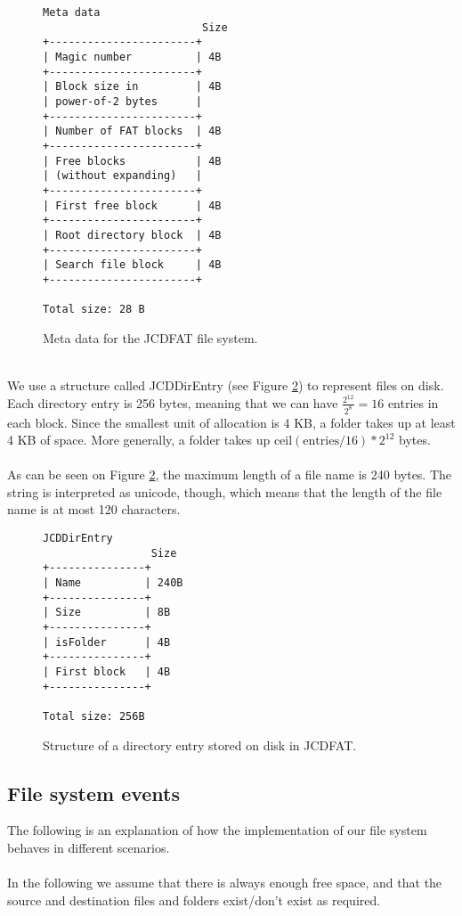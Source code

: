 \documentclass[11pt]{article}
\begin{document}
\begin{figure}[ht]
    \begin{verbatim}
Meta data
                         Size
+-----------------------+
| Magic number          | 4B
+-----------------------+
| Block size in         | 4B
| power-of-2 bytes      |
+-----------------------+
| Number of FAT blocks  | 4B
+-----------------------+
| Free blocks           | 4B
| (without expanding)   |
+-----------------------+
| First free block      | 4B
+-----------------------+
| Root directory block  | 4B
+-----------------------+
| Search file block     | 4B
+-----------------------+

Total size: 28 B
    \end{verbatim}
    \caption{Meta data for the JCDFAT file system.}
    \label{fig:meta_data}
\end{figure}
~\\
We use a structure called JCDDirEntry (see Figure \ref{fig:directory_entry}) to represent files on disk. Each directory entry is 256 bytes, meaning that we can have $\frac{2^{12}}{2^8} = 16$ entries in each block. Since the smallest unit of allocation is 4 KB, a folder takes up at least 4 KB of space. More generally, a folder takes up $\text{ceil}(\text{entries} / 16) * 2^{12}$ bytes.\\
\\
As can be seen on Figure \ref{fig:directory_entry}, the maximum length of a file name is 240 bytes. The string is interpreted as unicode, though, which means that the length of the file name is at most 120 characters.

\begin{figure}[ht]
    \begin{verbatim}
JCDDirEntry
                 Size
+---------------+
| Name          | 240B
+---------------+
| Size          | 8B
+---------------+
| isFolder      | 4B
+---------------+
| First block   | 4B
+---------------+

Total size: 256B
    \end{verbatim}
    \caption{Structure of a directory entry stored on disk in JCDFAT.}
    \label{fig:directory_entry}
\end{figure}

\subsection{File system events}\label{file-system-events}
The following is an explanation of how the implementation of our file system behaves in different scenarios.\\
\\
In the following we assume that there is always enough free space, and that the source and destination files and folders exist/don't exist as required.\\
\end{document}
